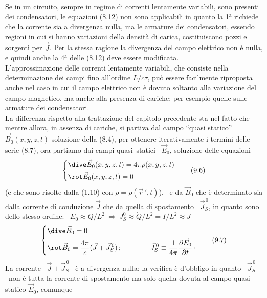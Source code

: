 Se in un circuito, sempre in regime di correnti lentamente variabili, sono
presenti dei condensatori, le equazioni (8.12) non sono applicabili in quanto la
1$^\mathrm{a}$ richiede che la corrente sia a divergenza nulla, ma le armature
dei condensatori, essendo regioni in cui si hanno variazioni della densit\`a di
carica, costituiscono pozzi e sorgenti per $\vec J$. Per la stessa ragione la
divergenza del campo elettrico non \`e nulla, e quindi anche la 4$^\mathrm{a}$
delle (8.12) deve essere modificata.\\
L'approssimazione delle correnti lentamente variabili, che consiste nella
determinazione dei campi fino all'ordine $L/c\tau$, pu\`o essere facilmente
riproposta anche nel caso in cui il campo elettrico non \`e dovuto soltanto alla
variazione del campo magnetico, ma anche alla presenza di cariche: per esempio
quelle sulle armature dei condensatori.\\
La differenza rispetto alla trattazione del capitolo precedente sta nel fatto
che mentre allora, in assenza di cariche, si partiva dal campo ``quasi statico''
$\vec B_0(x,y,z,t)$ soluzione
della (8.4), per ottenere iterativamente i termini delle serie (8.7), ora
partiamo dai campi quasi--statici \ $\vec E_0$, soluzione delle equazioni
\begin{equation}
  \left\{\begin{aligned}
    &\dive\vec E_0(x,y,z,t)=4\pi\rho(x,y,z,t)\\
    &\rot\vec E_0(x,y,z,t)=0
  \end{aligned}\right.
  \tag{9.6}
\end{equation}
\big(e che sono risolte dalla (1.10) con $\rho=\rho(\vec r\,',t)$\big), \ e da
$\vec B_0$ che \`e determinato sia dalla corrente di conduzione $\vec J$ che da
quella di spostamento \ $\vec J_S^{\,0}$, in quanto sono dello stesso ordine:
\ $E_0\approx Q/L^2\ \Rightarrow\ J_S^0\approx\dot Q/L^2=I/L^2\approx J$
\begin{equation}
  \left\{\begin{aligned}
    &\dive\vec B_0=0\\
    &\rot\vec B_0=\frac{4\pi}{c}(\vec J+\vec J_S^{\,0})\,;
    \qquad\qquad\vec J_S^{\,0}
    \equiv\frac{1}{4\pi}\frac{\partial\vec E_0}{\partial t}\,\cdot
  \end{aligned}\right.
  \tag{9.7}
\end{equation}
La corrente \ $\vec J+\vec J_S^{\,0}$ \ \`e a divergenza nulla: la verifica \`e
d'obbligo in quanto \ $\vec J_S^{\,0}$ \ non \`e tutta la corrente di
spostamento ma solo quella dovuta al campo quasi--statico $\vec E_0$, comunque
